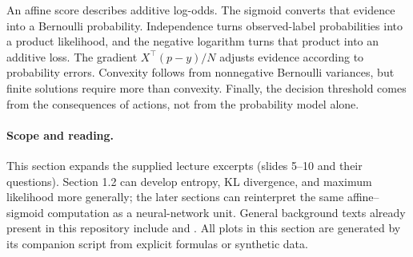 \begin{keyidea}
An affine score describes additive log-odds. The sigmoid converts that evidence
into a Bernoulli probability. Independence turns observed-label probabilities
into a product likelihood, and the negative logarithm turns that product into
an additive loss. The gradient $X^\top(p-y)/N$ adjusts evidence according to
probability errors. Convexity follows from nonnegative Bernoulli variances, but
finite solutions require more than convexity. Finally, the decision threshold
comes from the consequences of actions, not from the probability model alone.
\end{keyidea}

\paragraph{Scope and reading.}
This section expands the supplied lecture excerpts (slides 5--10 and their
questions). Section 1.2 can develop entropy, KL divergence, and maximum likelihood
more generally; the later sections can reinterpret the same affine--sigmoid
computation as a neural-network unit. General background texts already present
in this repository include \citet{bishop2006pattern} and
\citet{goodfellow2016deep}. All plots in this section are generated by its companion
script from explicit formulas or synthetic data.
